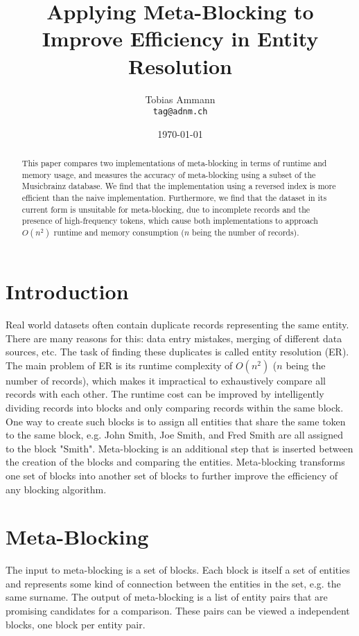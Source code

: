 \documentclass[a4paper,12pt]{article}
\begin{document}
\title{Applying Meta-Blocking to Improve Efficiency in Entity Resolution}
\author{
  Tobias Ammann\\
  \texttt{tag@adnm.ch}}

\date{\today}
\maketitle

\begin{abstract}
This paper compares two implementations of meta-blocking in terms of runtime and memory usage, and measures the accuracy of meta-blocking using a subset of the Musicbrainz database. We find that the implementation using a reversed index is more efficient than the naive implementation. Furthermore, we find that the dataset in its current form is unsuitable for meta-blocking, due to incomplete records and the presence of high-frequency tokens, which cause both implementations to approach $O(n^{2})$ runtime and memory consumption ($n$ being the number of records).
\end{abstract}

\section{Introduction}
Real world datasets often contain duplicate records representing the same entity. There are many reasons for this: data entry mistakes, merging of different data sources, etc. The task of finding these duplicates is called entity resolution (ER). The main problem of ER is its runtime complexity of $O(n^{2})$ ($n$ being the number of records), which makes it impractical to exhaustively compare all records with each other. The runtime cost can be improved by intelligently dividing records into blocks and only comparing records within the same block.
One way to create such blocks is to assign all entities that share the same token to the same block, e.g. John Smith, Joe Smith, and Fred Smith are all assigned to the block "Smith". Meta-blocking \cite{10.1109/TKDE.2013.54} is an additional step that is inserted between the creation of the blocks and comparing the entities. Meta-blocking transforms one set of blocks into another set of blocks to further improve the efficiency of any blocking algorithm.

\section{Meta-Blocking}
The input to meta-blocking is a set of blocks. Each block is itself a set of entities and represents some kind of connection between the entities in the set, e.g. the same surname. The output of meta-blocking is a list of entity pairs that are promising candidates for a comparison. These pairs can be viewed a independent blocks, one block per entity pair.
\end{document}
